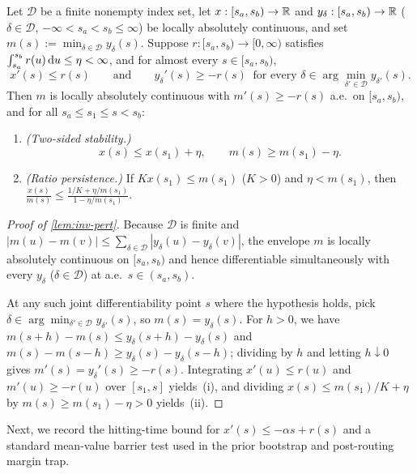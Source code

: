 \begin{lemma}
\label{lem:inv-pert}
Let $\mathcal D$ be a finite nonempty index set, let $x : [s_a, s_b) \to \mathbb R$ and $y_\delta : [s_a, s_b) \to \mathbb R$ ($\delta \in \mathcal D$, $-\infty < s_a < s_b \le \infty$) be locally absolutely continuous, and set $m(s) := \min_{\delta\in\mathcal D} y_\delta(s)$. Suppose $r : [s_a, s_b) \to [0, \infty)$ satisfies $\int_{s_a}^{s_b} r(u)\,\mathrm{d} u \le \eta < \infty$, and for almost every $s \in [s_a, s_b)$,
\[
  x'(s) \le r(s) \qquad\text{and}\qquad y_\delta'(s) \ge -r(s) \;\;\text{for every } \delta \in \arg\min_{\delta'\in\mathcal D} y_{\delta'}(s).
\]
Then $m$ is locally absolutely continuous with $m'(s) \ge -r(s)$ a.e.\ on $[s_a, s_b)$, and for all $s_a \le s_1 \le s < s_b$:
\begin{enumerate}[label=(\roman*),leftmargin=*,itemsep=1pt,topsep=2pt]
\item \emph{(Two-sided stability.)}
\begin{equation}
  x(s) \le x(s_1) + \eta, \qquad m(s) \ge m(s_1) - \eta.
  \label{eq:rms-floor-shift}
\end{equation}
\item \emph{(Ratio persistence.)} If $K x(s_1) \le m(s_1)$ ($K > 0$) and $\eta < m(s_1)$, then $\frac{x(s)}{m(s)} \le \frac{1/K + \eta/m(s_1)}{1 - \eta/m(s_1)}$.
\end{enumerate}
\end{lemma}
\begin{proof}[Proof of \cref{lem:inv-pert}]
Because $\mathcal D$ is finite and $|m(u) - m(v)| \le \sum_{\delta\in\mathcal D}|y_\delta(u) - y_\delta(v)|$, the envelope $m$ is locally absolutely continuous on $[s_a, s_b)$ and hence differentiable simultaneously with every $y_\delta$ ($\delta \in \mathcal D$) at a.e.\ $s \in (s_a, s_b)$.

At any such joint differentiability point $s$ where the hypothesis holds, pick $\delta \in \arg\min_{\delta'\in\mathcal D} y_{\delta'}(s)$, so $m(s) = y_\delta(s)$. For $h > 0$, we have $m(s + h) - m(s) \le y_\delta(s + h) - y_\delta(s)$ and $m(s) - m(s - h) \ge y_\delta(s) - y_\delta(s - h)$; dividing by $h$ and letting $h \downarrow 0$ gives $m'(s) = y_\delta'(s) \ge -r(s)$. Integrating $x'(u) \le r(u)$ and $m'(u) \ge -r(u)$ over $[s_1, s]$ yields~(i), and dividing $x(s) \le m(s_1)/K + \eta$ by $m(s) \ge m(s_1) - \eta > 0$ yields~(ii).
\end{proof}

Next, we record the hitting-time bound for $x'(s) \le -\alpha s + r(s)$ and a standard mean-value barrier test used in the prior bootstrap and post-routing margin trap.

